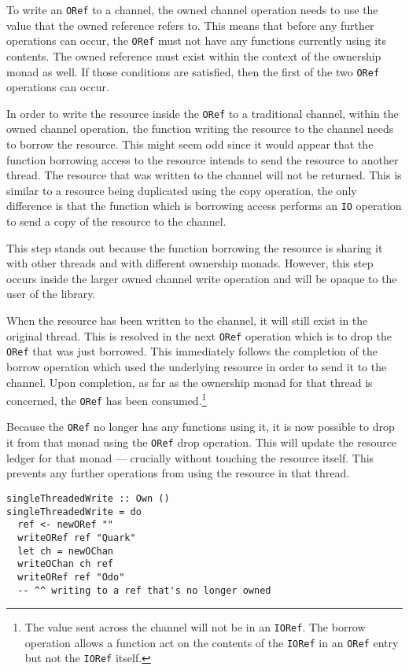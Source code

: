 \documentclass[onehalf,11pt]{beavtex}
\begin{document}
To write an \texttt{ORef} to a channel, the owned channel operation
needs to use the value that the owned reference refers to.  This means
that before any further operations can occur, the \texttt{ORef} must not have
any functions currently using its contents. The owned reference must exist
within the context of the ownership monad as well.
If those conditions are satisfied, then the first of the two \texttt{ORef}
operations can occur.

In order to write the resource inside the \texttt{ORef} to a traditional
channel, within the owned channel operation, the function writing the resource
to the channel needs to borrow the resource.
This might seem odd since it would appear that the function borrowing access
to the resource intends to send the resource to another thread.
The resource that was written to the channel will not be returned.
This is similar to a resource being duplicated using the copy operation, the
only difference is that the function which is borrowing access 
performs an \texttt{IO} operation to send a copy of the resource to the
channel.

This step stands out because the function borrowing the resource is sharing
it with other threads and with different ownership monads.
However, this step occurs inside the larger owned channel write operation and
will be opaque to the user of the library.

When the resource has been written to the channel, it will still exist in the
original thread.
This is resolved in the next \texttt{ORef} operation which is to drop
the \texttt{ORef} that was just borrowed.
This immediately follows the completion of the borrow operation which used the
underlying resource in order to send it to the channel.
Upon completion, as far as the ownership monad for that thread is
concerned, the \texttt{ORef} has been consumed.\footnote{The value sent across
  the channel will not be in an \texttt{IORef}.
  The borrow operation allows a function act on the contents of the
  \texttt{IORef} in an \texttt{ORef} entry but not the \texttt{IORef} itself.
 }

Because the \texttt{ORef} no longer has any functions using it, it is now
possible to drop it from that monad using the \texttt{ORef} drop operation.
This will update the resource ledger for that monad --- crucially without
touching the resource itself.
This prevents any further operations from using the resource in that thread.

\newpage

\begin{lstlisting}
singleThreadedWrite :: Own ()
singleThreadedWrite = do
  ref <- newORef ""
  writeORef ref "Quark"
  let ch = newOChan
  writeOChan ch ref
  writeORef ref "Odo"
  -- ^^ writing to a ref that's no longer owned
\end{lstlisting}
\end{document}
